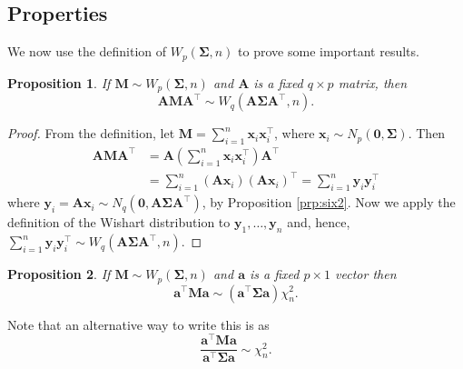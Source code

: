 \documentclass[
]{book}
\newtheorem{proposition}{Proposition}[chapter]
\theoremstyle{definition}
\theoremstyle{definition}
\theoremstyle{definition}
\theoremstyle{definition}
\theoremstyle{remark}
\begin{document}
\subsection{Properties}\label{properties-1}

We now use the definition of \(W_p(\boldsymbol{\Sigma}, n)\) to prove some important
results.

\begin{proposition}
\protect\hypertarget{prp:six8}{}\label{prp:six8}If \(\mathbf M\sim W_p(\boldsymbol{\Sigma},n)\) and \(\mathbf A\) is a fixed \(q \times p\) matrix, then
\[ \mathbf A\mathbf M\mathbf A^\top \sim W_q \left(\mathbf A\boldsymbol{\Sigma}\mathbf A^\top, n \right).\]
\end{proposition}

\begin{proof}
From the definition, let \(\mathbf M= \sum_{i=1}^n \mathbf x_i \mathbf x_i^\top\), where \(\mathbf x_i \sim N_p({\boldsymbol 0},\boldsymbol{\Sigma})\). Then
\begin{align*}
\mathbf A\mathbf M\mathbf A^\top &= \mathbf A\left(\sum_{i=1}^n \mathbf x_i \mathbf x_i^\top \right)\mathbf A^\top\\
 &= \sum_{i=1}^n (\mathbf A\mathbf x_i)(\mathbf A\mathbf x_i)^\top = \sum_{i=1}^n \mathbf y_i \mathbf y_i^\top
\end{align*}
where \(\mathbf y_i = \mathbf A\mathbf x_i \sim N_q({\boldsymbol 0},\mathbf A\boldsymbol{\Sigma}\mathbf A^\top)\), by Proposition \ref{prp:six2}. Now we apply the definition of the Wishart distribution to \(\mathbf y_1,\ldots,\mathbf y_n\) and, hence, \(\sum_{i=1}^n \mathbf y_i \mathbf y_i^\top \sim W_q\left(\mathbf A\boldsymbol{\Sigma}\mathbf A^\top, n \right)\).
\end{proof}

\begin{proposition}
\protect\hypertarget{prp:six9}{}\label{prp:six9}If \(\mathbf M\sim W_p(\boldsymbol{\Sigma},n)\) and \(\mathbf a\) is a fixed \(p \times 1\) vector then
\[ \mathbf a^\top \mathbf M\mathbf a\sim \left(\mathbf a^\top \boldsymbol{\Sigma}\mathbf a\right)\chi_n^2.\]
\end{proposition}

Note that an alternative way to write this is as
\[\frac{ \mathbf a^\top \mathbf M\mathbf a}{ \mathbf a^\top \boldsymbol{\Sigma}\mathbf a} \sim \chi_n^2.\]
\end{document}
